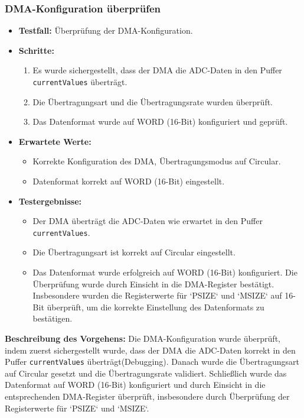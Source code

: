 \subsubsection{DMA-Konfiguration überprüfen}
\begin{itemize}
    \item \textbf{Testfall:} Überprüfung der DMA-Konfiguration.
    \item \textbf{Schritte:}
    \begin{enumerate}
        \item Es wurde sichergestellt, dass der DMA die ADC-Daten in den Puffer \texttt{currentValues} überträgt.
        \item Die Übertragungsart und die Übertragungsrate wurden überprüft.
        \item Das Datenformat wurde auf WORD (16-Bit) konfiguriert und geprüft.
    \end{enumerate}
    \item \textbf{Erwartete Werte:}
    \begin{itemize}
        \item Korrekte Konfiguration des DMA, Übertragungsmodus auf Circular.
        \item Datenformat korrekt auf WORD (16-Bit) eingestellt.
    \end{itemize}
    \item \textbf{Testergebnisse:}
    \begin{itemize}
        \item Der DMA überträgt die ADC-Daten wie erwartet in den Puffer \texttt{currentValues}.
        \item Die Übertragungsart ist korrekt auf Circular eingestellt.
        \item Das Datenformat wurde erfolgreich auf WORD (16-Bit) konfiguriert. Die Überprüfung wurde durch Einsicht in die DMA-Register bestätigt. Insbesondere wurden die Registerwerte für `PSIZE` und `MSIZE` auf 16-Bit überprüft, um die korrekte Einstellung des Datenformats zu bestätigen.
    \end{itemize}
\end{itemize}


\textbf{Beschreibung des Vorgehens:}
Die DMA-Konfiguration wurde überprüft, indem zuerst sichergestellt wurde, dass der DMA die ADC-Daten korrekt in den Puffer \texttt{currentValues} überträgt(Debugging). Danach wurde die Übertragungsart auf Circular gesetzt und die Übertragungsrate validiert. Schließlich wurde das Datenformat auf WORD (16-Bit) konfiguriert und durch Einsicht in die entsprechenden DMA-Register überprüft, insbesondere durch Überprüfung der Registerwerte für `PSIZE` und `MSIZE`.

